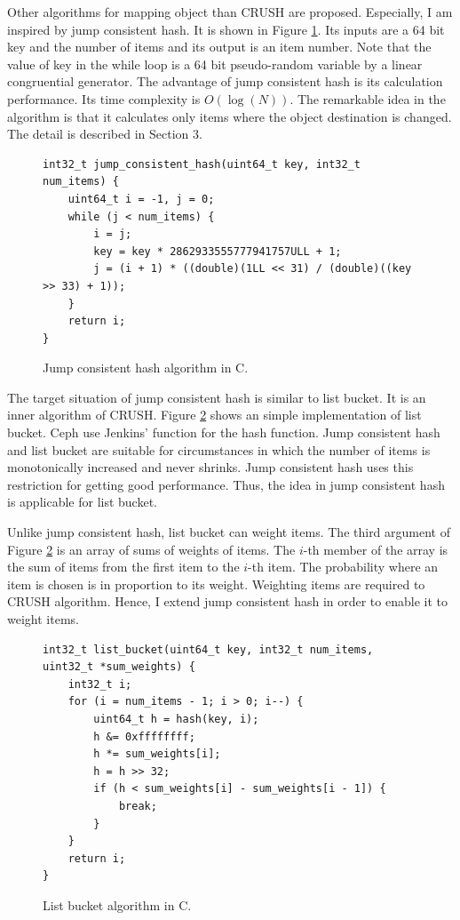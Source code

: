 \documentclass[a4paper,11pt]{article}
\begin{document}
Other algorithms for mapping object than CRUSH are proposed. Especially, I am inspired by jump consistent hash\cite{jump-consistent-hash}. It is shown in Figure \ref{code_jumpconsistenthash}.
Its inputs are a 64 bit key and the number of items and its output is  an item number.
Note that the value of key in the while loop is a 64 bit pseudo-random variable by a linear congruential generator\cite{lecuyer}.
The advantage of jump consistent hash is its calculation performance.
Its time complexity is $O(\log(N))$.
The remarkable idea in the algorithm is that it calculates only items where the object destination is changed.
The detail is described in Section 3.

\begin{figure}[tbp]
\lstset{language=C}
\begin{footnotesize}
\begin{lstlisting}[frame=single]
int32_t jump_consistent_hash(uint64_t key, int32_t num_items) {
    uint64_t i = -1, j = 0;
    while (j < num_items) {
        i = j;
        key = key * 2862933555777941757ULL + 1;
        j = (i + 1) * ((double)(1LL << 31) / (double)((key >> 33) + 1));
    }
    return i;
}
\end{lstlisting}
\end{footnotesize}
\caption{Jump consistent hash algorithm in C.}
\label{code_jumpconsistenthash}
\end{figure}

The target situation of jump consistent hash is similar to list bucket. It is an inner algorithm of CRUSH.
Figure \ref{code_listbucket} shows an simple implementation of list bucket. Ceph use Jenkins' function\cite{jenkins} for the hash function.
Jump consistent hash and list bucket are suitable for circumstances in which the number of items is monotonically increased and never shrinks.
Jump consistent hash uses this restriction for getting good performance.
Thus, the idea in jump consistent hash is applicable for list bucket.

Unlike jump consistent hash, list bucket can weight items.
The third argument of Figure \ref{code_listbucket} is an array of sums of weights of items.
The $i$-th member of the array is the sum of items from the first item to the $i$-th item.
The probability where an item is chosen is in proportion to its weight.
Weighting items are required to CRUSH algorithm.
Hence, I extend jump consistent hash in order to enable it to weight items.

\begin{figure}[tbp]
\lstset{language=C}
\begin{footnotesize}
\begin{lstlisting}[frame=single]
int32_t list_bucket(uint64_t key, int32_t num_items, uint32_t *sum_weights) {
    int32_t i;
    for (i = num_items - 1; i > 0; i--) {
        uint64_t h = hash(key, i);
        h &= 0xffffffff;
        h *= sum_weights[i];
        h = h >> 32;
        if (h < sum_weights[i] - sum_weights[i - 1]) {
            break;
        }
    }
    return i;
}
\end{lstlisting}
\end{footnotesize}
\caption{List bucket algorithm in C.}
\label{code_listbucket}
\end{figure}
\end{document}
